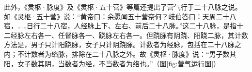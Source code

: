 \documentclass[12pt]{ctexbook}
\begin{document}
此外，《灵枢·脉度》及《灵枢·五十营》等篇还提出了营气行于二十八脉之说。如《灵枢·五十营》说：“黄帝曰：余愿闻五十营奈何？岐伯答曰：天周二十八宿，……日行二十八宿，人经脉上下、左右、前后二十八脉。”这二十八脉，是指十二经脉左右各一、任督脉各一、跷脉左右各一。但跷脉有阴跷、阳跷二脉，其计数方法是，男子只计阳跷脉，女子只计阴跷脉。计数者为经脉，包括在二十八脉之内；不计数者为络脉，排除在二十八脉之外。故《灵枢·脉度》说：“男子数其阳，女子数其阴，当数者为经，不当数者为络也。”（图\ref{fig:营气运行图}）

\end{document}
